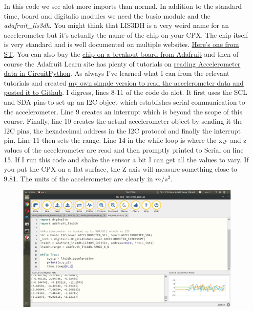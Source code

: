 {In this code we see alot more imports than normal. In addition to the standard time, board and digitalio modules we need the busio module and the {\it adafruit\_lis3dh}. You might think that LIS3DH is a very weird name for an accelerometer but it’s actually the name of the chip on your CPX. The chip itself is very standard and is well documented on multiple websites. \href{https://www.st.com/en/mems-and-sensors/lis3dh.html}{Here’s one from ST}. You can also buy the \href{https://www.adafruit.com/product/2809?gclid=EAIaIQobChMI98qfjrC86gIVEI_ICh2JtQ-JEAAYAiAAEgJ2_fD_BwE}{chip on a breakout board from Adafruit} and then of course the Adafruit Learn site has plenty of tutorials on \href{https://learn.adafruit.com/circuitpython-hardware-lis3dh-accelerometer/software}{reading Accelerometer data in CircuitPython}. As always I’ve learned what I can from the relevant tutorials and created \href{https://github.com/cmontalvo251/Microcontrollers/blob/master/Circuit_Playground/CircuitPython/Accelerometer/low_level_accel.py}{my own simple version to read the accelerometer data and posted it to Github}. I digress, lines 8-11 of the code do alot. It first uses the SCL and SDA pins to set up an I2C object which establishes serial communication to the accelerometer. Line 9 creates an interrupt which is beyond the scope of this course. Finally, line 10 creates the actual accelerometer object by sending it the I2C pins, the hexadecimal address in the I2C protocol and finally the interrupt pin. Line 11 then sets the range. Line 14 in the while loop is where the x,y and z values of the accelerometer are read and then promptly printed to Serial on line 15. If I run this code and shake the sensor a bit I can get all the values to vary. If you put the CPX on a flat surface, the Z axis will measure something close to 9.81. The units of the accelerometer are clearly in $m/s^2$.
\begin{figure}[H]
  \begin{center}
    \includegraphics[width=\textwidth]{Figures/accelerometer_mu.png}
  \end{center}
\end{figure}

}
